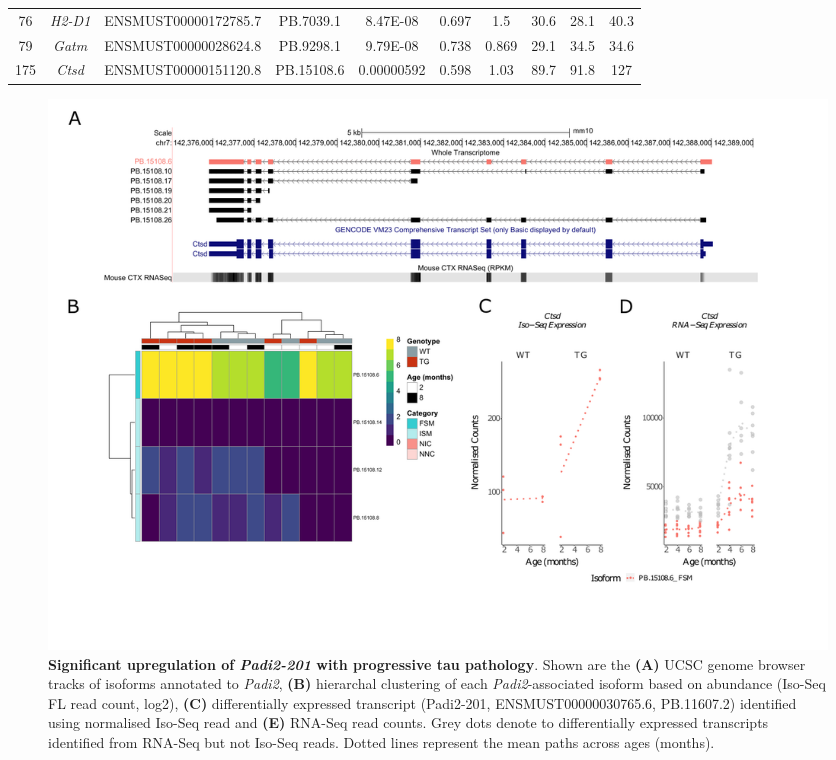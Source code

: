 \begin{landscape}
\begin{table}[]
\begin{tabular}{@{}cccccccccc@{}}
		76  & \textit{H2-D1}  & ENSMUST00000172785.7  & PB.7039.1  & 8.47E-08   & 0.697 & 1.5   & 30.6  & 28.1  & 40.3  \\
		79  & \textit{Gatm}   & ENSMUST00000028624.8  & PB.9298.1  & 9.79E-08   & 0.738 & 0.869 & 29.1  & 34.5  & 34.6  \\
		175 & \textit{Ctsd}   & ENSMUST00000151120.8  & PB.15108.6 & 0.00000592 & 0.598 & 1.03  & 89.7  & 91.8  & 127   \\ \bottomrule
	\end{tabular}
	\label{tab:DEI_trans}
\end{table}
\end{landscape}

\begin{landscape}
	\begin{figure}[!htp]
		\centering
		\includegraphics[page=4,trim={1.5cm 3.5cm 2cm 1cm}, scale = 0.85]{Figures/Ch5_DiffPlots_Landscape.pdf}
		\captionsetup{width=1.5\textwidth}
		\caption[Differential Isoform Expression: \textit{Padi2}]%
		{\textbf{Significant upregulation of \textit{Padi2-201} with progressive tau pathology}. Shown are the \textbf{(A)} UCSC genome browser tracks of isoforms annotated to \textit{Padi2}, \textbf{(B)} hierarchal clustering of each \textit{Padi2}-associated isoform based on abundance (Iso-Seq FL read count, log2), \textbf{(C)} differentially expressed transcript (Padi2-201, ENSMUST00000030765.6, PB.11607.2) identified using normalised Iso-Seq read and \textbf{(E)} RNA-Seq read counts. Grey dots denote to differentially expressed transcripts identified from RNA-Seq but not Iso-Seq reads. Dotted lines represent the mean paths across ages (months).}   
		\label{fig:Padi2}
	\end{figure}	
\end{landscape}


